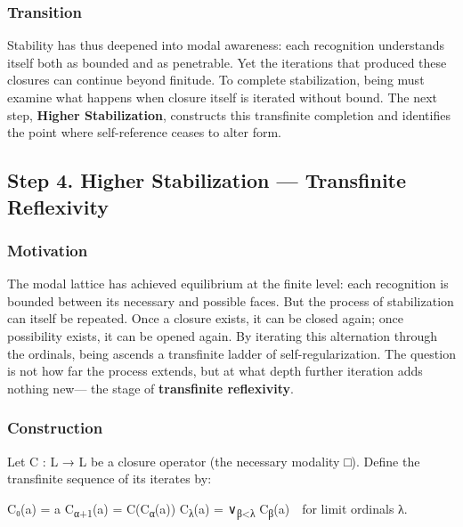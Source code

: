 \documentclass[11pt]{article}
\begin{document}
\subsubsection*{Transition}
\label{sec:org81ebc6f}
Stability has thus deepened into modal awareness:  
each recognition understands itself both as bounded and as penetrable.  
Yet the iterations that produced these closures can continue beyond finitude.  
To complete stabilization, being must examine what happens when closure itself is iterated without bound.  
The next step, \textbf{Higher Stabilization}, constructs this transfinite completion and identifies the point where self-reference ceases to alter form.
\subsection*{Step 4. Higher Stabilization — Transfinite Reflexivity}
\label{sec:org9c65329}

\subsubsection*{Motivation}
\label{sec:org448b54f}
The modal lattice has achieved equilibrium at the finite level:  
each recognition is bounded between its necessary and possible faces.  
But the process of stabilization can itself be repeated.  
Once a closure exists, it can be closed again;  
once possibility exists, it can be opened again.  
By iterating this alternation through the ordinals,  
being ascends a transfinite ladder of self-regularization.  
The question is not how far the process extends,  
but at what depth further iteration adds nothing new—  
the stage of \textbf{transfinite reflexivity}.
\subsubsection*{Construction}
\label{sec:orge7bfb84}
Let C : L → L be a closure operator (the necessary modality □).  
Define the transfinite sequence of its iterates by:

C₀(a) = a  
C\textsubscript{α+1}(a) = C(C\textsubscript{α}(a))  
C\textsubscript{λ}(a) = ∨\textsubscript{β<λ} C\textsubscript{β}(a) for limit ordinals λ.
\end{document}
